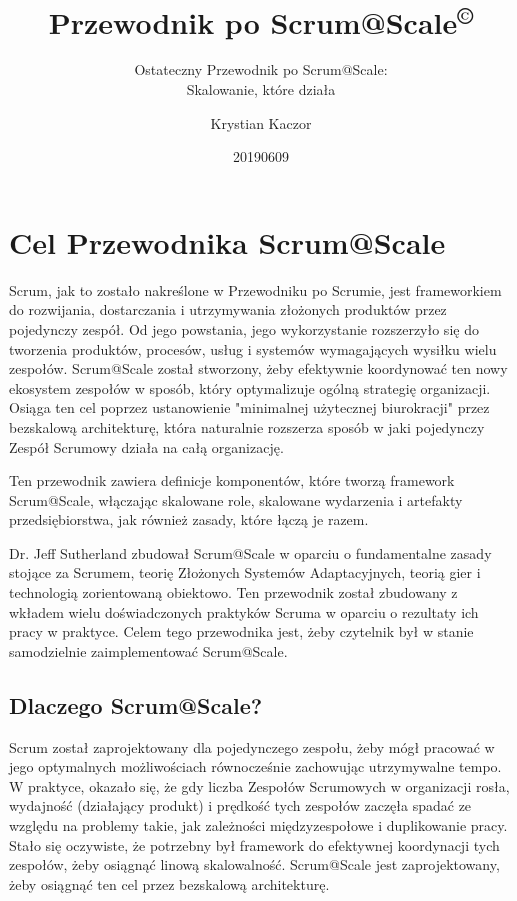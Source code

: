 \documentclass[12pt,a4paper,parskip=full]{scrartcl}
\title{\Huge{\color{red}\textbf{Przewodnik po Scrum@Scale\textsuperscript{\copyright}}}}
\subtitle{\color{gray}Ostateczny Przewodnik po Scrum@Scale:\\ Skalowanie, które działa}
\author{Krystian Kaczor}
\date{20190609}
\begin{document}

\section{Cel Przewodnika Scrum@Scale}

Scrum, jak to zostało nakreślone w Przewodniku po Scrumie, jest frameworkiem do rozwijania, dostarczania i utrzymywania złożonych produktów przez pojedynczy zespół. Od jego powstania, jego wykorzystanie rozszerzyło się do tworzenia produktów, procesów, usług i systemów wymagających wysiłku wielu zespołów. Scrum@Scale został stworzony, żeby efektywnie koordynować ten nowy ekosystem zespołów w sposób, który optymalizuje ogólną strategię organizacji. Osiąga ten cel poprzez ustanowienie "minimalnej użytecznej biurokracji" przez bezskalową architekturę, która naturalnie rozszerza sposób w jaki pojedynczy Zespół Scrumowy działa na całą organizację.

Ten przewodnik zawiera definicje komponentów, które tworzą framework Scrum@Scale, włączając skalowane role, skalowane wydarzenia i artefakty przedsiębiorstwa, jak również zasady, które łączą je razem.

Dr. Jeff Sutherland zbudował Scrum@Scale w oparciu o fundamentalne zasady stojące za Scrumem, teorię Złożonych Systemów Adaptacyjnych, teorią gier i technologią zorientowaną obiektowo. Ten przewodnik został zbudowany z wkładem wielu doświadczonych praktyków Scruma w oparciu o rezultaty ich pracy w praktyce. Celem tego przewodnika jest, żeby czytelnik był w stanie samodzielnie zaimplementować Scrum@Scale.

\subsection{Dlaczego Scrum@Scale?}

Scrum został zaprojektowany dla pojedynczego zespołu, żeby mógł pracować w jego optymalnych możliwościach równocześnie zachowując utrzymywalne tempo. W praktyce, okazało się, że gdy liczba Zespołów Scrumowych w organizacji rosła, wydajność (działający produkt) i prędkość tych zespołów zaczęła spadać ze względu na problemy takie, jak zależności międzyzespołowe i duplikowanie pracy. Stało się oczywiste, że potrzebny był framework do efektywnej koordynacji tych zespołów, żeby osiągnąć linową skalowalność. Scrum@Scale jest zaprojektowany, żeby osiągnąć ten cel przez bezskalową architekturę.
\end{document}
